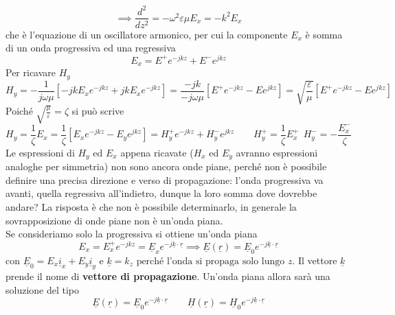 \documentclass{book}
\begin{document}
    \begin{equation}
        \implies \frac{d^{2}}{dz^{2}} = - \omega^{2} \varepsilon \mu E_{x} = - k^{2}E_{x}
    \end{equation}
    che è l'equazione di un oscillatore armonico, per cui la componente $E_{x}$ è somma di un onda progressiva ed una regressiva
    \begin{equation}
        E_{x} = E^{+}e^{-j k z} + E^{-}e^{jkz}
    \end{equation}
    Per ricavare $H_{y}$
    \begin{equation}
        H_{y} = -\frac{1}{j \omega \mu} [-jkE_{x} e^{-jkz}+jkE_{x}e^{-jkz}] = \frac{-jk}{-j\omega \mu} [E^{+}e^{-jkz}-Ee^{jkz}] = \sqrt{\frac{\varepsilon}{\mu}}[E^{+}e^{-jkz}-Ee^{jkz}]
    \end{equation}
    Poiché $\sqrt{\frac{\mu}{\varepsilon}} = \zeta$ si può scrive
    \begin{equation}
        H_{y} = \frac{1}{\zeta}E_{x} = \frac{1}{\zeta}[E_{x}e^{-jkz}-E_{y}e^{jkz}] = H_{y}^{+}e^{-jkz}+H_{y}^{-}e^{jkz} \qquad H_{y} ^{+} = \frac{1}{\zeta}E_{x} ^{+} \ \ H_{y} ^{-} = - \frac{E^{-} _{x}}{\zeta}
    \end{equation}
    Le espressioni di $H_{y}$ ed $E_{x}$ appena ricavate ($H_{x}$ ed $E_{y}$ avranno espressioni analoghe per simmetria) non sono ancora onde piane, perché non è possibile definire una precisa direzione e verso di propagazione: l'onda progressiva va avanti, quella regressiva 
    all'indietro, dunque la loro somma dove dovrebbe andare? La risposta è che non è possibile determinarlo, in generale la sovrapposizione di onde piane non è un'onda piana. \\
    Se consideriamo solo la progressiva si ottiene un'onda piana
    \begin{equation}
        E_{x} = E_{x} ^{+}e^{-jkz} = \underline{E}_{x} e^{-j \underline{k} \cdot \underline{r}}  \implies \underline{E}(\underline{r}) = \underline{E}_{0}e^{-j \underline{k} \cdot \underline{r}}
    \end{equation}
    con  $\underline{E}_{0} = E_{x} \underline{i}_{x} +E_{y} \underline{i}_{y}$ e $\underline{k} = k_{z} \textrm{ perché l'onda si propaga solo lungo } z$.
    Il vettore $\underline{k}$ prende il nome di \textbf{vettore di propagazione}. Un'onda piana allora sarà una soluzione del tipo
    \begin{equation}
        \underline{E} (\underline{r}) = \underline{E}_{0} e^{-j\underline{k} \cdot \underline{r}} \qquad \underline{H} (\underline{r}) = \underline{H}_{0} e^{-j\underline{k} \cdot \underline{r}}
    \end{equation}
\end{document}
